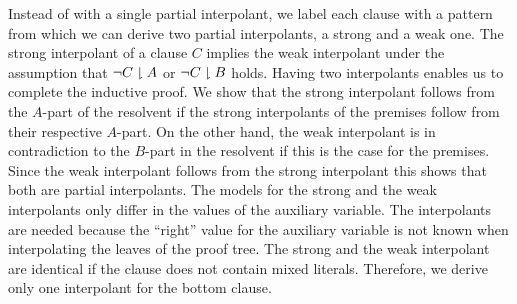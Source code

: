 \ifnewinterpolation\else
Instead of with a single partial interpolant, we label each clause with a
pattern from which we can derive two partial interpolants, a strong and a weak
one.  The strong interpolant of a clause $C$ implies the weak interpolant under
the assumption that $\lnot C\downharpoonright A$ or $\lnot C\downharpoonright B$ holds.
Having two
interpolants enables us to complete the inductive proof.  
We show that the strong interpolant follows from the $A$-part of the
resolvent if the strong interpolants of the premises follow from their
respective $A$-part.  On the other hand, the weak interpolant is in
contradiction to the $B$-part in the resolvent if this is the case for
the premises.  Since the weak interpolant follows from the strong
interpolant this shows that both are partial interpolants.
The models for the strong and the weak interpolants only differ in the
values of the auxiliary variable.  The interpolants are needed because 
the ``right'' value
for the auxiliary variable is not known when interpolating the leaves 
of the proof tree.
The strong and the weak interpolant are identical if the clause does not
contain mixed literals.  Therefore, we derive only one interpolant for the
bottom clause.
\fi


